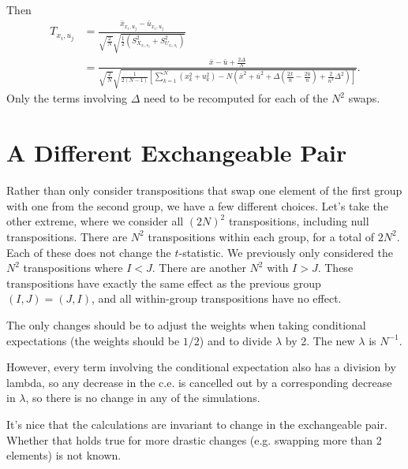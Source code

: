 Then
\begin{align*}
  T_{x_i,u_j} &= \frac{\bar{x}_{x_i,u_j}-\bar{u}_{x_i,u_j}}
  {\sqrt{\frac{2}{N}}\sqrt{\frac{1}{2}(S_{X_{x_i,u_j}}^2+S_{U_{x_i,u_j}}^2)}}\\
  &= \frac{\bar{x}-\bar{u}+\frac{2\Delta}{N}}
  {\sqrt{\frac{2}{N}}\sqrt{\frac{1}{2(N-1)}[\sum_{k=1}^N (x_k^2+u_k^2)
      -N(\bar{x}^2+\bar{u}^2+\Delta(\frac{2\bar{x}}{n}
      -\frac{2\bar{u}}{n})+\frac{2}{n^2}\Delta^2)]}}.
\end{align*}
Only the terms involving $\Delta$ need to be recomputed for each of the $N^2$ swaps.

\section{A Different Exchangeable Pair}
Rather than only consider transpositions that swap one element of the
first group with one from the second group, we have a few different
choices.  Let's take the other extreme, where we consider all $(2N)^2$
transpositions, including null transpositions.  There are $N^2$
transpositions within each group, for a total of $2N^2$.  Each of
these does not change the $t$-statistic.  We previously only
considered the $N^2$ transpositions where $I < J$.  There are another
$N^2$ with $I > J$.  These transpositions have exactly the same effect
as the previous group $(I, J) = (J, I)$, and all within-group
transpositions have no effect.

The only changes should be to adjust the weights when taking
conditional expectations (the weights should be $1/2$) and to divide
$\lambda$ by 2.  The new $\lambda$ is $N^{-1}$.

However, every term involving the conditional expectation also has a
division by lambda, so any decrease in the c.e. is cancelled out by a
corresponding decrease in $\lambda$, so there is no change in any of
the simulations.

It's nice that the calculations are invariant to change in the
exchangeable pair.  Whether that holds true for more drastic changes
(e.g. swapping more than 2 elements) is not known.
